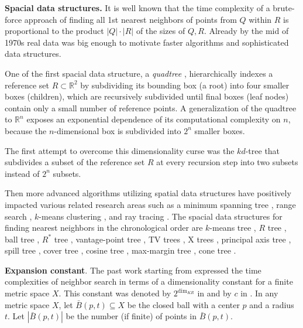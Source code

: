 \documentclass{vgtc}                          %
\numberwithin{algocf}{section}
\theoremstyle{definition}
\theoremstyle{definition}
\theoremstyle{definition}
\theoremstyle{plain}
\newcommand{\R}{\mathbb{R}}
\begin{document}
\noindent
\textbf{Spacial data structures.}
It is well known that the time complexity of a brute-force approach of finding all 1st nearest neighbors of points from $Q$ within $R$ is proportional to the product $|Q|\cdot|R|$ of the sizes of $Q, R$.
Already by the mid of 1970s real data was big enough to motivate faster algorithms and sophisticated data structures.
\medskip

\noindent
One of the first spacial data structure, a \emph{quadtree} \cite{finkel1974quad}, hierarchically indexes a reference set $R\subset\R^2$ by subdividing its bounding box (a root) into four smaller boxes (children), which are recursively subdivided until final boxes (leaf nodes) contain only a small number of reference points.
A generalization of the quadtree to $\R^n$ exposes an exponential dependence of its computational complexity on $n$, because the $n$-dimensional box is subdivided into $2^n$ smaller boxes.
\medskip

\noindent
The first attempt to overcome this dimensionality curse was the $kd$-tree \cite{bentley1975multidimensional} that subdivides a subset of the reference set $R$ at every  recursion step into two subsets instead of $2^n$ subsets.
\medskip

\noindent
Then more advanced algorithms utilizing spatial data structures have positively impacted various related research areas such as a minimum spanning tree \cite{bentley1978fast}, range search \cite{pelleg1999accelerating},  $k$-means clustering  \cite{pelleg1999accelerating}, and ray tracing \cite{fussell1988fast}.
The spacial data structures for finding nearest neighbors in the chronological order are $k$-means tree \cite{fukunaga1975branch}, $R$ tree \cite{beckmann1990r}, ball tree \cite{omohundro1989five}, $R^*$ tree \cite{beckmann1990r}, vantage-point tree \cite{yianilos1993data}, TV trees \cite{lin1994tv}, X trees \cite{berchtold1996x}, principal axis tree \cite{mcnames2001fast}, spill tree \cite{liu2004investigation}, cover tree \cite{beygelzimer2006cover}, cosine tree \cite{holmes2008quic}, max-margin tree \cite{ram2012nearest}, cone tree \cite{ram2012maximum}.
\medskip

\noindent
\textbf{Expansion constant}. 
The past work starting from \cite{karger2002finding} expressed the time complexities of neighbor search in terms of a dimensionality constant for a finite metric space $X$.
This constant was denoted by $2^{\text{dim}_{KR}}$ in \cite[Section~2.1]{krauthgamer2004navigating} and by $c$ in
\cite[Section~1]{beygelzimer2006cover}.
In any metric space $X$, let $\bar B(p,t)\subseteq X$ be the closed ball with a center $p$ and a radius $t$.
Let $|\bar B(p,t)|$ be the number (if finite) of points in $\bar B(p,t)$. 
\end{document}
